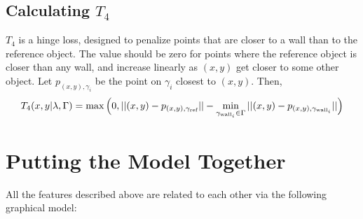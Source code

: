 \documentclass[12pt,letterpaper]{article}
\newcommand\refobj{\textmd{ref}}
\begin{document}
\subsection*{Calculating $T_4$}
$T_4$ is a hinge loss, designed to penalize points that are closer to a wall than to the reference object. The value should be zero for points where the reference object is closer than any wall, and increase linearly as $(x, y)$ get closer to some other object. Let $p_{(x, y), \gamma_i}$ be the point on $\gamma_i$ closest to $(x, y)$. Then,
\[
T_4(x, y|\lambda, \Gamma) = \max\Big(0, ||(x, y) - p_{(x, y), \gamma_{\refobj}}|| - \min_{\gamma_{\textmd{wall}_i} \in \Gamma} ||(x, y) - p_{(x, y), \gamma_{\textmd{wall}_i}}||\Big)
\]

\section*{Putting the Model Together}
All the features described above are related to each other via the following graphical model:\indent\vspace{-10pt}
\end{document}
